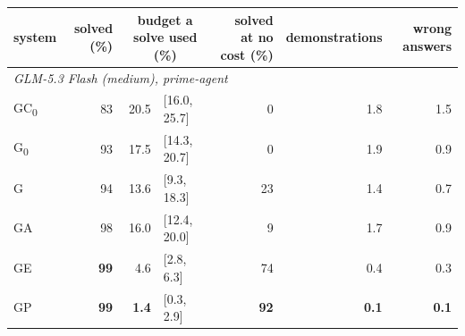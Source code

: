 \begin{tabular}{lrr@{\hspace{0.4em}}lrrr}
\toprule
system & solved (\%) & \multicolumn{2}{c}{budget a solve used (\%)} & solved at no cost (\%) & demonstrations & wrong answers \\
\midrule
\multicolumn{7}{l}{\emph{GLM-5.3 Flash (medium), prime-agent}} \\
GC\textsubscript{0} & 83 & 20.5 & {\scriptsize [16.0, 25.7]} & 0 & 1.8 & 1.5 \\
G\textsubscript{0} & 93 & 17.5 & {\scriptsize [14.3, 20.7]} & 0 & 1.9 & 0.9 \\
G & 94 & 13.6 & {\scriptsize [9.3, 18.3]} & 23 & 1.4 & 0.7 \\
GA & 98 & 16.0 & {\scriptsize [12.4, 20.0]} & 9 & 1.7 & 0.9 \\
GE & \textbf{99} & 4.6 & {\scriptsize [2.8, 6.3]} & 74 & 0.4 & 0.3 \\
GP & \textbf{99} & \textbf{1.4} & {\scriptsize [0.3, 2.9]} & \textbf{92} & \textbf{0.1} & \textbf{0.1} \\
\bottomrule
\end{tabular}
